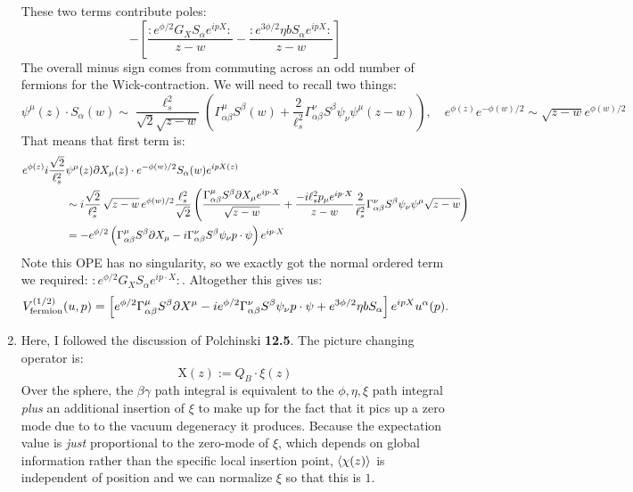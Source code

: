 \documentclass[11pt, class=article, crop=false]{standalone}
\begin{document}
\begin{enumerate}
	These two terms contribute poles:
	\[
		- \left[\frac{ :e^{\phi/2} G_X S_\alpha e^{i p X}: }{z-w} - \frac{:e^{3\phi/2} \eta b S_\alpha e^{i p X}: }{z-w} \right]
	\]
	The overall minus sign comes from commuting across an odd number of fermions for the Wick-contraction. We will need to recall two things:
	\[
		\psi^\mu(z) \cdot S_\alpha(w) \sim \frac{\ell_s^2}{\sqrt 2 {\sqrt{z-w}}} \left( \Gamma^\mu_{\alpha \beta} S^{\beta}(w) + \frac{2}{\ell_s^2} \Gamma^\nu_{\alpha \beta} S^\beta \psi_\nu \psi^\mu (z-w)\right),
		\quad e^{\phi(z)} e^{-\phi(w)/2} \sim \sqrt{z-w} e^{\phi(w)/2}
	\]
	That means that first term is:
	\[
	\begin{aligned}
		e^{\phi (z)} i \frac{\sqrt{2}}{\ell_s^2} &\psi^\mu(z) \partial X_\mu(z) \cdot e^{-\phi(w)/2} S_\alpha(w) e^{i p X(z)} \\
		&\sim  i \frac{\sqrt 2}{\ell_s^2} \,\sqrt{z-w} \, e^{\phi(w)/2} \frac{\ell_s^2}{\sqrt 2} \left(\frac{\Gamma_{\alpha \beta}^{\mu} S^\beta \partial X_\mu e^{i p \cdot X}}{\sqrt{z-w}} +  \frac{-i \ell_s^2 p_\mu e^{i p \cdot X} }{z-w} \frac{2}{\ell_s^2} \Gamma^\nu_{\alpha \beta} S^\beta \psi_\nu \psi^\mu \sqrt{z-w} \right)\\
		& = -e^{\phi/2} \left( \Gamma^\mu_{\alpha \beta} S^\beta \partial X_\mu 
		- i \Gamma^\nu_{\alpha \beta} S^\beta \psi_\nu p \cdot \psi  \right) e^{i p \cdot X}
	\end{aligned}
	\]
	Note this OPE has no singularity, so we exactly got the normal ordered term we required: $:e^{\phi/2} G_X S_\alpha e^{i p \cdot X}:$. 
	Altogether this gives us:
	\[
		V^{(1/2)}_{\text{fermion}} (u, p) = \left[e^{\phi/2} \Gamma_{\alpha \beta}^\mu S^\beta \partial X^\mu -i e^{\phi/2} \Gamma_{\alpha \beta}^\nu S^\beta \psi_\nu p \cdot \psi  + e^{3 \phi/2} \eta b S_\alpha
		\right] e^{i p X} u^\alpha(p).
	\]
	\item Here, I followed the discussion of Polchinski \textbf{12.5}. The picture changing operator is:
	\[
		\mathrm X(z) := Q_B \cdot \xi (z) %
	\]
	Over the sphere, the $\beta \gamma$ path integral is equivalent to the $\phi, \eta, \xi$ path integral \emph{plus} an additional insertion of $\xi$ to make up for the fact that it pics up a zero mode due to to the vacuum degeneracy it produces. Because the expectation value is \emph{just} proportional to the zero-mode of $\xi$, which depends on global information rather than the specific local insertion point, $\braket{\chi(z)}$ is independent of position and we can normalize $\xi$ so that this is $1$. 
	

\end{enumerate}
\end{document}
